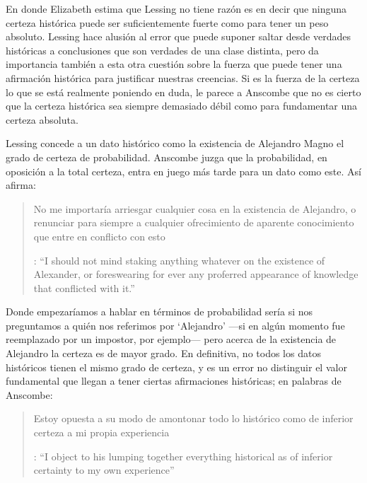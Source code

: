 En donde Elizabeth estima que Lessing no tiene razón es en decir que ninguna certeza histórica puede ser suficientemente fuerte como para tener un peso absoluto. Lessing hace alusión al error que puede suponer saltar desde verdades históricas a conclusiones que son verdades de una clase distinta, pero da importancia también a esta otra cuestión sobre la fuerza que puede tener una afirmación histórica para justificar nuestras creencias. Si es la fuerza de la certeza lo que se está realmente poniendo en duda, le parece a Anscombe que no es cierto que la certeza histórica sea siempre demasiado débil como para fundamentar una certeza absoluta.

Lessing concede a un dato histórico como la existencia de Alejandro Magno el grado de certeza de probabilidad. Anscombe juzga que la probabilidad, en oposición a la total certeza, entra en juego más tarde para un dato como este. Así afirma: \blockquote[{\cite[26]{anscombe2008faith:prophandmi}}: \enquote{I should not mind staking anything whatever on the existence of Alexander, or foreswearing for ever any proferred appearance of knowledge that conflicted with it.}]{No me importaría arriesgar cualquier cosa en la existencia de Alejandro, o renunciar para siempre a cualquier ofrecimiento de aparente conocimiento que entre en conflicto con esto}. Donde empezaríamos a hablar en términos de probabilidad sería si nos preguntamos a quién nos referimos por `Alejandro' ---si en algún momento fue reemplazado por un impostor, por ejemplo--- pero acerca de la existencia de Alejandro la certeza es de mayor grado. En definitiva, no todos los datos históricos tienen el mismo grado de certeza, y es un error no distinguir el valor fundamental que llegan a tener ciertas afirmaciones históricas; en palabras de Anscombe: \blockquote[{\cite[27]{anscombe2008faith:prophandmi}}: \enquote{I object to his lumping together everything historical as of inferior certainty to my own experience}]{Estoy opuesta a su modo de amontonar todo lo histórico como de inferior certeza a mi propia experiencia}.

